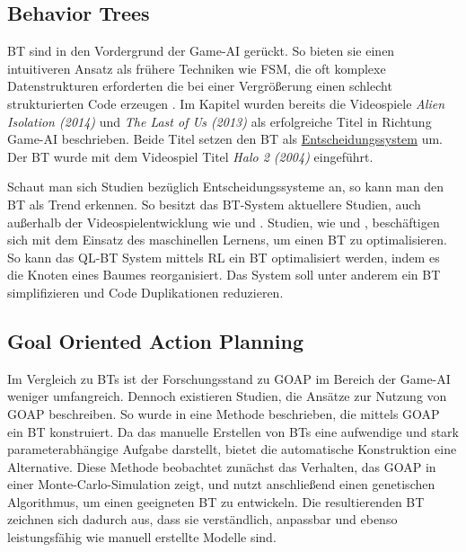 \subsection{Behavior Trees}
\label{chap:bt sota}

BT sind in den Vordergrund der Game-AI ger\"{u}ckt. So bieten sie einen intuitiveren Ansatz als fr\"{u}here Techniken wie FSM, die oft komplexe Datenstrukturen erforderten die bei einer Vergr\"{o}\ss{}erung einen schlecht strukturierten Code erzeugen \autocite{qlbt}. Im Kapitel wurden bereits die Videospiele \textit{Alien Isolation (2014)} und \textit{The Last of Us (2013)} als erfolgreiche Titel in Richtung Game-AI beschrieben. Beide Titel setzen den BT als \hyperref[chap:entscheidungssysteme]{Entscheidungssystem} um. Der BT wurde mit dem Videospiel Titel \textit{Halo 2 (2004)} eingef\"{u}hrt.

Schaut man sich Studien bez\"{u}glich Entscheidungssysteme an, so kann man den BT als Trend erkennen. So besitzt das BT-System aktuellere Studien, auch au\ss{}erhalb der Videospielentwicklung wie \autocite{btuav} und \autocite{8963263}. Studien, wie \autocite{rbt} und \autocite{qlbt}, besch\"{a}ftigen sich mit dem Einsatz des maschinellen Lernens, um einen BT zu optimalisieren. So kann das {QL-BT} System \autocite{qlbt} mittels RL ein BT optimalisiert werden, indem es die Knoten eines Baumes reorganisiert. Das System soll unter anderem ein BT simplifizieren und Code Duplikationen reduzieren.


\subsection{Goal Oriented Action Planning}
\label{chap:goap sota}

Im Vergleich zu BTs ist der Forschungsstand zu GOAP im Bereich der Game-AI weniger umfangreich. Dennoch existieren Studien, die Ans\"{a}tze zur Nutzung von GOAP beschreiben. So wurde in \autocite{Schwab2021} eine Methode beschrieben, die mittels GOAP ein BT konstruiert. Da das manuelle Erstellen von BTs eine aufwendige und stark parameterabh\"{a}ngige Aufgabe darstellt, bietet die automatische Konstruktion eine Alternative. Diese Methode beobachtet zun\"{a}chst das Verhalten, das GOAP in einer Monte-Carlo-Simulation zeigt, und nutzt anschlie\ss{}end einen genetischen Algorithmus, um einen geeigneten BT zu entwickeln. Die resultierenden BT zeichnen sich dadurch aus, dass sie verst\"{a}ndlich, anpassbar und ebenso leistungsf\"{a}hig wie manuell erstellte Modelle sind. \autocite{Schwab2021}

